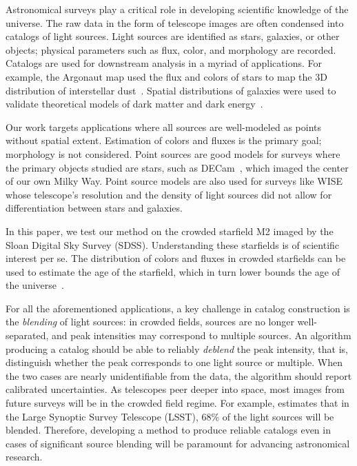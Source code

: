 Astronomical surveys play a critical role in developing scientific knowledge of the universe.
The raw data in the form of telescope images
are often condensed into catalogs of light sources. 
Light sources are identified as stars, galaxies, or other objects; physical parameters such as flux, color, and morphology are recorded. Catalogs are used for downstream analysis in a myriad of applications. For example, the Argonaut map used the flux and colors of stars to map the 3D distribution of interstellar dust~\cite{Green_2019_argonaut}. Spatial distributions of galaxies were used to 
validate theoretical models of dark matter and dark energy~\cite{Eisenstein_2005_darkmatter}. 

Our work targets applications where all sources are well-modeled as points without spatial extent. Estimation of colors and fluxes is the primary goal; morphology is not considered. 
Point sources are good models for surveys where the primary objects studied are stars, such as DECam~\cite{Schlafly_2018_DECam}, which imaged the center of our own Milky Way. Point source models are also used for surveys like WISE~\cite{Wright_2010_WISESurvey} whose telescope's resolution and the density of light sources did not allow for differentiation between stars and galaxies. 

In this paper, we test our method on the crowded starfield M2 imaged by the Sloan Digital Sky Survey (SDSS). 
Understanding these starfields is of scientific interest per se. The distribution 
of colors and fluxes in crowded starfields 
can be used to estimate the age 
of the starfield, which in turn lower bounds the 
age of the universe~\cite{Isochrome_fitting}. 

For all the aforementioned applications, a key challenge
in catalog construction is the {\itshape blending} of light sources: in crowded fields, sources are no longer well-separated, and peak intensities may correspond to multiple sources. An algorithm producing a catalog should be able to reliably {\itshape deblend} the peak intensity, that is, distinguish whether the peak corresponds to one light source or 
multiple. When the two cases are nearly unidentifiable from the data, the algorithm should 
report calibrated uncertainties. As telescopes peer deeper into space, most images from future surveys will be in the crowded field regime. 
For example, \cite{Bosch_2017_LSST} estimates that in the Large Synoptic Survey Telescope (LSST), 68\% of the light sources will be blended. Therefore, developing a method to produce reliable catalogs even in cases of significant source blending will be paramount for advancing astronomical research. 

